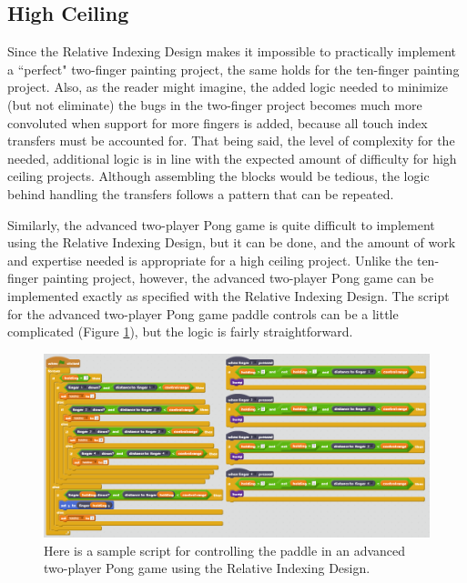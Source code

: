 \subsection{High Ceiling}

Since the Relative Indexing Design makes it impossible to practically implement a ``perfect" two-finger painting project, the same holds for the ten-finger painting project. Also, as the reader might imagine, the added logic needed to minimize (but not eliminate) the bugs in the two-finger project becomes much more convoluted when support for more fingers is added, because all touch index transfers must be accounted for. That being said, the level of complexity for the needed, additional logic is in line with the expected amount of difficulty for high ceiling projects. Although assembling the blocks would be tedious, the logic behind handling the transfers follows a pattern that can be repeated.

Similarly, the advanced two-player Pong game is quite difficult to implement using the Relative Indexing Design, but it can be done, and the amount of work and expertise needed is appropriate for a high ceiling project. Unlike the ten-finger painting project, however, the advanced two-player Pong game can be implemented exactly as specified with the Relative Indexing Design. The script for the advanced two-player Pong game paddle controls can be a little complicated (Figure \ref{AdvancedTwoPlayerPongRID}), but the logic is fairly straightforward. 

\begin{figure}
\centering
\includegraphics[width=1.0\textwidth]{images/AdvancedTwoPlayerPongRID.PNG}
\caption[Sample Relative Indexing Design Script For Advanced Two-Player Pong]{Here is a sample script for controlling the paddle in an advanced two-player Pong game using the Relative Indexing Design.}
\label{AdvancedTwoPlayerPongRID}
\end{figure}

